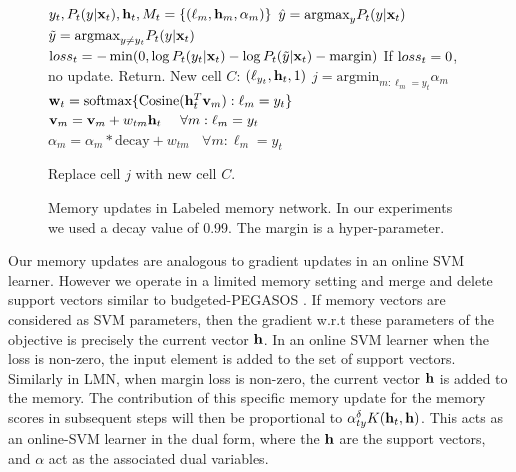 \documentclass[letterpaper]{article} %
\newcommand{\vek}[1]{{\bf {#1}}}
\newcommand{\vx}{{\vek{x}}}
\newcommand{\vw}{{\vek{w}}}
\newcommand{\vh}{{\vek{h}}}
\newcommand{\vM}{{\vek{v}}}
\newcommand{\argmax}{{\text{argmax}}}
\newcommand{\argmin}{{\text{argmin}}}
\newcommand{\loss}{{\text loss}}
\def\shiv#1{\todo [color=orange]{Shiv: #1}}
\def\sunita#1{\todo [color=purple]{Sunita: #1}}
\begin{document}
\begin{figure}
\begin{center}
\begin{algorithmic}
   $y_t, P_t(y|\vx_t), \vh_t, M_t = \{(\ell_m, \vh_m, \alpha_m)\}$
  \STATE $\hat{y} = \argmax_y P_t(y|\vx_t)$
  \STATE $\tilde{y} = \argmax_{y \neq y_t} P_t(y|\vx_t)$
  \STATE $\loss_t = - \min(0, \log P_t(y_t|\vx_t) - \log P_t(\tilde{y}|\vx_t) - \text{margin} )$
  \STATE If $\loss_t=0$, no update. Return.
  \STATE New cell $C$: $(\ell_{y_t}, \vh_t, 1)$
  \STATE $j = \argmin_{m:\ell_m = y_t} \alpha_m$
  \STATE $\vw_t = \text{softmax}\{\text{Cosine}(\vh_t^T \vM_m) :\ell_m = y_t\}$
  \STATE $\vM_{m} = \vM_{m} + w_{tm}{\vh_t}~~~~\forall m: \ell_m = y_t$
  \STATE $\alpha_{m} = \alpha_m*\text{decay} + w_{tm}~~~~\forall m: \ell_m = y_t$

  \STATE Replace cell $j$ with new cell $C$.
  \ENDIF
\end{algorithmic}
\caption{\label{alg-write}Memory updates in Labeled memory network. In our experiments we used a decay value of 0.99.   The margin is a hyper-parameter.}
\end{center}
\end{figure}

Our memory updates are analogous to gradient updates in an online SVM learner. However we operate in a limited memory setting and merge and delete support vectors similar to budgeted-PEGASOS \cite{WangCV10}. If memory vectors are considered as SVM parameters, then the gradient w.r.t these parameters of the objective is precisely the current vector $\bf{h}$. In an online SVM learner when the loss is non-zero, the input element is added to the set of support vectors. Similarly in LMN, when margin loss is non-zero, the current vector $\bf{h}$ is added to the memory. The contribution of this specific memory update for the memory scores in subsequent steps will then be proportional to $\alpha_{ty}^\delta K(\vh_t, \bf{h})$. This acts as an online-SVM learner in the dual form, where the $\bf{h}$ are the support vectors, and $\alpha$ act as the associated dual variables. 
\end{document}
